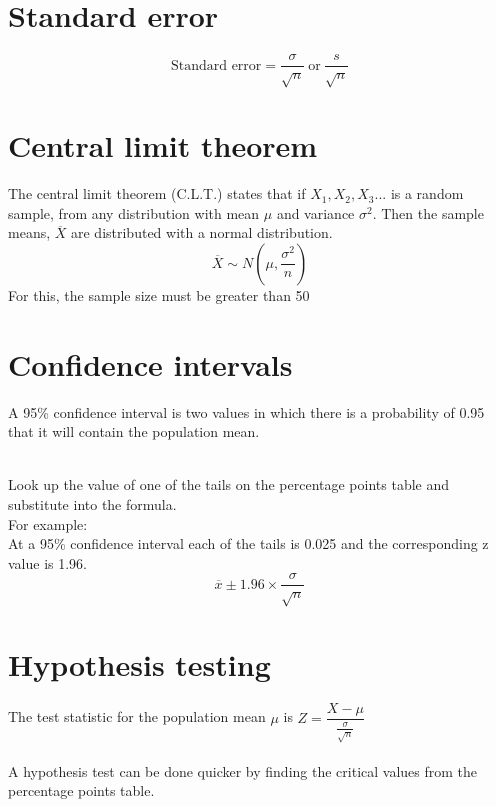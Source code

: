 \documentclass{article}[18pt]
\begin{document}
\section{Standard error}
$$\textrm{Standard error}=\frac{\sigma}{\sqrt{n}} \ \textrm{or} \ \frac{s}{\sqrt{n}}$$
\section{Central limit theorem}
The central limit theorem (C.L.T.) states that if $X_1,X_2,X_3...$ is a random sample, from any distribution with mean $\mu$ and variance $\sigma^2$. Then the sample means, $\overline{X}$ are distributed with a normal distribution.
$$\overline{X}\sim N(\mu,\frac{\sigma^2}{n})$$ 
For this, the sample size must be greater than 50
\section{Confidence intervals}
A 95\% confidence interval is two values in which there is a probability of 0.95 that it will contain the population mean.\\
\\
Look up the value of one of the tails on the percentage points table and substitute into the formula.\\
For example:\\
At a 95\% confidence interval each of the tails is 0.025 and the corresponding z value is 1.96.\\
$$\overline{x}\pm1.96\times\frac{\sigma}{\sqrt{n}}$$
\section{Hypothesis testing}
The test statistic for the population mean $\mu$ is $Z=\dfrac{X-\mu}{\frac{\sigma}{\sqrt{n}}}$\\
\\
A hypothesis test can be done quicker by finding the critical values from the percentage points table.
\end{document}
